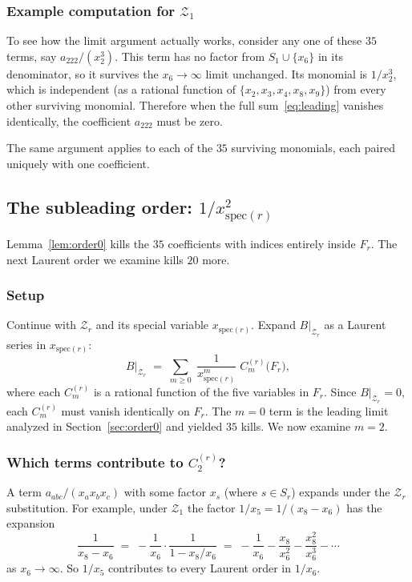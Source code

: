 \documentclass[11pt]{article}
\newcommand{\Z}{\mathcal{Z}}
\newcommand{\spec}{\mathrm{spec}}
\theoremstyle{definition}
\begin{document}
\subsubsection*{Example computation for $\Z_1$}

To see how the limit argument actually works, consider any one of these $35$
terms, say $a_{222}/(x_2^3)$. This term has no factor from $S_1\cup\{x_6\}$
in its denominator, so it survives the $x_6\to\infty$ limit unchanged. Its
monomial is $1/x_2^3$, which is independent (as a rational function of
$\{x_2,x_3,x_4,x_8,x_9\}$) from every other surviving monomial. Therefore
when the full sum~\eqref{eq:leading} vanishes identically, the coefficient
$a_{222}$ must be zero.

The same argument applies to each of the $35$ surviving monomials, each paired
uniquely with one coefficient.

\subsection{The subleading order: $1/x_{\spec(r)}^2$}
\label{sec:order2}

Lemma~\ref{lem:order0} kills the $35$ coefficients with indices entirely
inside $F_r$. The next Laurent order we examine kills $20$ more.

\subsubsection*{Setup}

Continue with $\Z_r$ and its special variable $x_{\spec(r)}$. Expand
$B|_{\Z_r}$ as a Laurent series in $x_{\spec(r)}$:
\begin{equation}
\label{eq:Laurent}
B|_{\Z_r} \;=\; \sum_{m\ge 0}\;\frac{1}{x_{\spec(r)}^m}\; C_m^{(r)}\bigl(F_r\bigr),
\end{equation}
where each $C_m^{(r)}$ is a rational function of the five variables in
$F_r$. Since $B|_{\Z_r}=0$, each $C_m^{(r)}$ must vanish identically on $F_r$.
The $m=0$ term is the leading limit analyzed in Section~\ref{sec:order0} and
yielded $35$ kills. We now examine $m=2$.

\subsubsection*{Which terms contribute to $C_2^{(r)}$?}

A term $a_{abc}/(x_a x_b x_c)$ with some factor $x_s$ (where $s\in S_r$)
expands under the $\Z_r$ substitution. For example, under $\Z_1$ the factor
$1/x_5 = 1/(x_8-x_6)$ has the expansion
\[
\frac{1}{x_8-x_6} \;=\; -\frac{1}{x_6}\cdot\frac{1}{1-x_8/x_6}
\;=\; -\frac{1}{x_6} - \frac{x_8}{x_6^2} - \frac{x_8^2}{x_6^3} - \cdots
\]
as $x_6\to\infty$. So $1/x_5$ contributes to every Laurent order in $1/x_6$.
\end{document}
